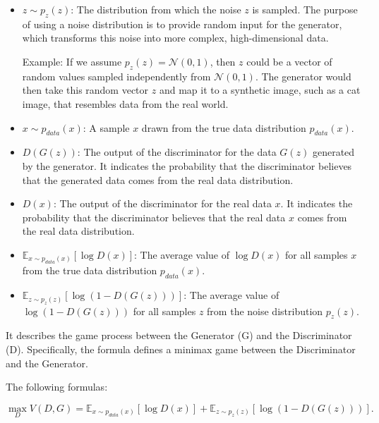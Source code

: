 \begin{itemize}
    \item \(z \sim p_z(z)\): The distribution from which the noise \(z\) is sampled. The purpose of using a noise distribution is to provide random input for the generator, which transforms this noise into more complex, high-dimensional data.
    
    Example: If we assume \( p_z(z) = \mathcal{N}(0, 1) \), then \(z\) could be a vector of random values sampled independently from \( \mathcal{N}(0, 1) \). The generator would then take this random vector \(z\) and map it to a synthetic image, such as a cat image, that resembles data from the real world.

    \item \(x \sim p_{data}(x)\): A sample \(x\) drawn from the true data distribution \(p_{data}(x)\).

    \item \(D(G(z))\): The output of the discriminator for the data \(G(z)\) generated by the generator. It indicates the probability that the discriminator believes that the generated data comes from the real data distribution.

    \item \(D(x)\): The output of the discriminator for the real data \(x\). It indicates the probability that the discriminator believes that the real data \(x\) comes from the real data distribution.

    \item \(\mathbb{E}_{x \sim p_{data}(x)}[\log D(x)]\): The average value of \(\log D(x)\) for all samples \(x\) from the true data distribution \(p_{data}(x)\).

    \item \(\mathbb{E}_{z \sim p_z(z)}[\log(1 - D(G(z)))]\): The average value of \(\log(1 - D(G(z)))\) for all samples \(z\) from the noise distribution \(p_z(z)\).
\end{itemize}


It describes the game process between the Generator (G) and the Discriminator (D). Specifically, 
the formula defines a minimax game between the Discriminator and the Generator.




The following formulas:

\begin{equation}
    \label{eq:max}
    \max_{D} V(D, G) = \mathbb{E}_{x \sim p_{data}(x)} [\log D(x)] + \mathbb{E}_{z \sim p_{z}(z)} [\log(1 - D(G(z)))].
\end{equation}

